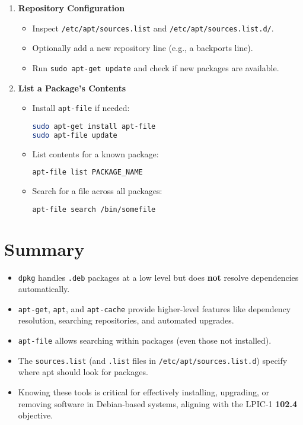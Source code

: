 \documentclass[a4paper]{report}
\begin{document}
\begin{enumerate}
    \item \textbf{Repository Configuration}
    \begin{itemize}
        \item Inspect \texttt{/etc/apt/sources.list} and \texttt{/etc/apt/sources.list.d/}.
        \item Optionally add a new repository line (e.g., a backports line).
        \item Run \texttt{sudo apt-get update} and check if new packages are available.
    \end{itemize}

    \item \textbf{List a Package’s Contents}
    \begin{itemize}
        \item Install \texttt{apt-file} if needed:
        \begin{lstlisting}[language=bash]
sudo apt-get install apt-file
sudo apt-file update
        \end{lstlisting}
        \item List contents for a known package:
        \begin{lstlisting}[language=bash]
apt-file list PACKAGE_NAME
        \end{lstlisting}
        \item Search for a file across all packages:
        \begin{lstlisting}[language=bash]
apt-file search /bin/somefile
        \end{lstlisting}
    \end{itemize}
\end{enumerate}

\section*{Summary}

\begin{itemize}
    \item \texttt{dpkg} handles \texttt{.deb} packages at a low level but does \textbf{not} resolve dependencies automatically.
    \item \texttt{apt-get}, \texttt{apt}, and \texttt{apt-cache} provide higher-level features like dependency resolution, searching repositories, and automated upgrades.
    \item \texttt{apt-file} allows searching within packages (even those not installed).
    \item The \texttt{sources.list} (and \texttt{.list} files in \texttt{/etc/apt/sources.list.d}) specify where apt should look for packages.
    \item Knowing these tools is critical for effectively installing, upgrading, or removing software in Debian-based systems, aligning with the LPIC-1 \textbf{102.4} objective.
\end{itemize}
\end{document}
